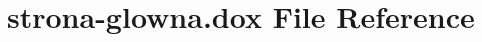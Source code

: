 \hypertarget{strona-glowna_8dox}{}\section{strona-\/glowna.dox File Reference}
\label{strona-glowna_8dox}
